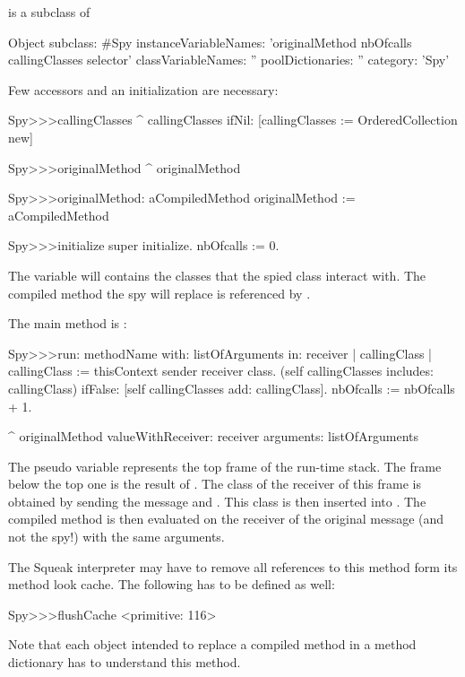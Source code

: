 \documentclass[a4paper,10pt,twoside]{book}
\begin{document}
 is a subclass of 
\begin{code}{}
Object subclass: #Spy
	instanceVariableNames: 'originalMethod nbOfcalls callingClasses selector'
	classVariableNames: ''
	poolDictionaries: ''
	category: 'Spy'
\end{code}

Few accessors and an initialization are necessary:
\begin{code}{}
Spy>>>callingClasses
	^ callingClasses ifNil: [callingClasses := OrderedCollection new]

Spy>>>originalMethod
	^ originalMethod

Spy>>>originalMethod: aCompiledMethod
	originalMethod := aCompiledMethod 

Spy>>>initialize
	super initialize.
	nbOfcalls := 0.
\end{code}

The variable  will contains the classes that the spied class interact with. The compiled method the spy will replace is referenced by .

The main method is :
\begin{code}{}
Spy>>>run: methodName with: listOfArguments in: receiver
	| callingClass |
	callingClass := thisContext sender receiver class.
	(self callingClasses includes: callingClass)
		ifFalse: [self callingClasses add: callingClass].
	nbOfcalls := nbOfcalls + 1.
		
	^ originalMethod valueWithReceiver: receiver arguments: listOfArguments 
\end{code}

The pseudo variable  represents the top frame of the run-time stack. The frame below the top one is the result of . The class of the receiver of this frame is obtained by sending the message  and . This class is then inserted into . The compiled method is then evaluated on the receiver of the original message (and not the spy!) with the same arguments.

The Squeak interpreter may have to remove all references to this method form its method look cache. The following has to be defined as well:

\begin{code}{}
Spy>>>flushCache
	<primitive: 116>
\end{code}

Note that each object intended to replace a compiled method in a method dictionary has to understand this method.
\end{document}
